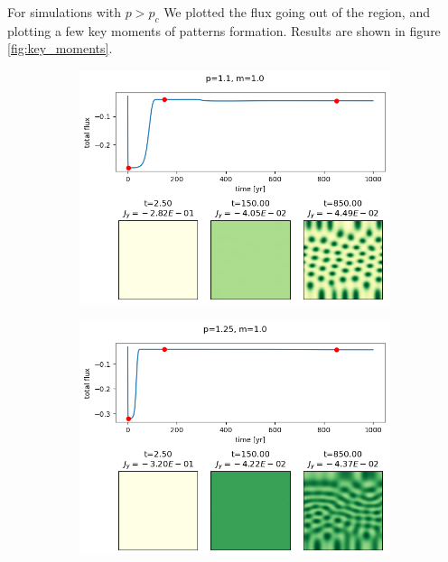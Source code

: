 \documentclass{article}
\numberwithin{equation}{section}
\begin{document}
For simulations with $p>p_c$ We plotted the flux going out of the region, and plotting a few key moments of patterns formation.  Results are shown in figure \ref{fig:key_moments}.

\begin{figure}[!ht]
    \centering
    \begin{subfigure}[]{0.5\textwidth}
        \centering
        \includegraphics[scale=0.5]{plots/p1_1_m1_0.png}
        \label{fig:p1_1}
    \end{subfigure}
    \begin{subfigure}[]{0.5\textwidth}
        \centering
        \includegraphics[scale=0.5]{plots/p1_25_m1_0.png}

\end{subfigure}
\end{figure}
\end{document}
